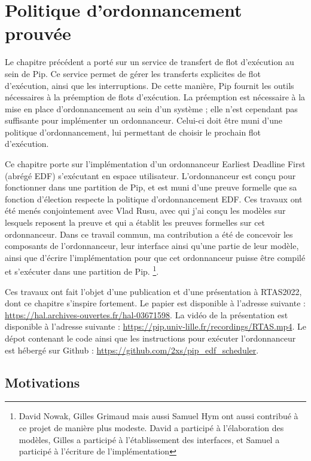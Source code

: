 \chapter{Politique d'ordonnancement prouvée}

	Le chapitre précédent a porté sur un service de transfert de flot d'exécution au sein de Pip. Ce service permet de gérer les transferts explicites de flot d'exécution, ainsi que les interruptions. De cette manière, Pip fournit les outils nécessaires à la préemption de flots d'exécution. La préemption est nécessaire à la mise en place d'ordonnancement au sein d'un système ; elle n'est cependant pas suffisante pour implémenter un ordonnanceur. Celui-ci doit être muni d'une politique d'ordonnancement, lui permettant de choisir le prochain flot d'exécution.

	Ce chapitre porte sur l'implémentation d'un ordonnanceur Earliest Deadline First (abrégé EDF) s'exécutant en espace utilisateur. L'ordonnanceur est conçu pour fonctionner dans une partition de Pip, et est muni d'une preuve formelle que sa fonction d'élection respecte la politique d'ordonnancement EDF. Ces travaux ont été menés conjointement avec Vlad Rusu, avec qui j'ai conçu les modèles sur lesquels reposent la preuve et qui a établit les preuves formelles sur cet ordonnanceur. Dans ce travail commun, ma contribution a été de concevoir les composants de l'ordonnanceur, leur interface ainsi qu'une partie de leur modèle, ainsi que d'écrire l'implémentation pour que cet ordonnanceur puisse être compilé et s'exécuter dans une partition de Pip.
	\footnote{David Nowak, Gilles Grimaud mais aussi Samuel Hym ont aussi contribué à ce projet de manière plus modeste. David a participé à l'élaboration des modèles, Gilles a participé à l'établissement des interfaces, et Samuel a participé à l'écriture de l'implémentation}.
	
	Ces travaux ont fait l'objet d'une publication et d'une présentation à RTAS2022, dont ce chapitre s'inspire fortement. Le papier est disponible à l'adresse suivante : \url{https://hal.archives-ouvertes.fr/hal-03671598}. La vidéo de la présentation est disponible à l'adresse suivante : \url{https://pip.univ-lille.fr/recordings/RTAS.mp4}. Le dépot contenant le code ainsi que les instructions pour exécuter l'ordonnanceur est hébergé sur Github : \url{https://github.com/2xs/pip_edf_scheduler}.

	\section{Motivations}
	
